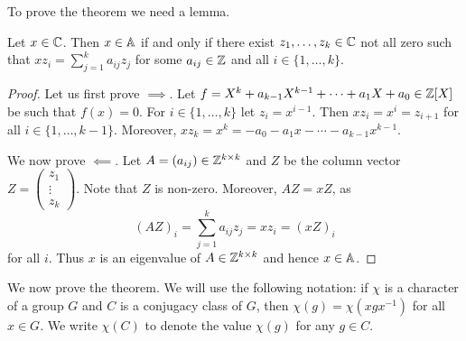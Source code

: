 To prove the theorem we need a lemma. 

\begin{lemma}
    Let $x\in\mathbb{C}$. Then $x\in\mathbb{A}$ if and only if 
    there exist $z_1,\dots,z_k\in\mathbb{C}$ not all zero such that 
    $xz_i=\sum_{j=1}^ka_{ij}z_j$ for some $a_{ij}\in\mathbb{Z}$ and 
    all $i\in\{1,\dots,k\}$. 
\end{lemma}

\begin{proof}
    Let us first prove $\implies$. Let $f=X^k+a_{k-1}X^{k-1}+\cdots+a_1X+a_0\in\mathbb{Z}[X]$
    be such that $f(x)=0$. For $i\in\{1,\dots,k\}$ let 
    $z_i=x^{i-1}$. Then 
    $xz_i=x^i=z_{i+1}$ for all $i\in\{1,\dots,k-1\}$. Moreover, 
    $xz_k=x^k=-a_0-a_1x-\cdots-a_{k-1}x^{k-1}$.
    
    We now prove $\impliedby$. Let $A=(a_{ij})\in\mathbb{Z}^{k\times k}$ and 
    $Z$ be the column vector 
    $Z=\begin{pmatrix}z_1\\\vdots\\z_k\end{pmatrix}$. Note that $Z$ is non-zero. 
    Moreover, $AZ=xZ$, as 
    \[
    (AZ)_i=\sum_{j=1}^ka_{ij}z_j=xz_i=(xZ)_i
    \]
    for all $i$. Thus $x$ is an eigenvalue of $A\in\mathbb{Z}^{k\times k}$ and
    hence $x\in\mathbb{A}$. 
\end{proof}

We now prove the theorem. We will use the following notation: if $\chi$ is a character
of a group $G$ 
and $C$ is a conjugacy class of $G$, then 
$\chi(g)=\chi(xgx^{-1})$ for all $x\in G$. We write 
$\chi(C)$ to denote the value $\chi(g)$ for any $g\in C$. 

